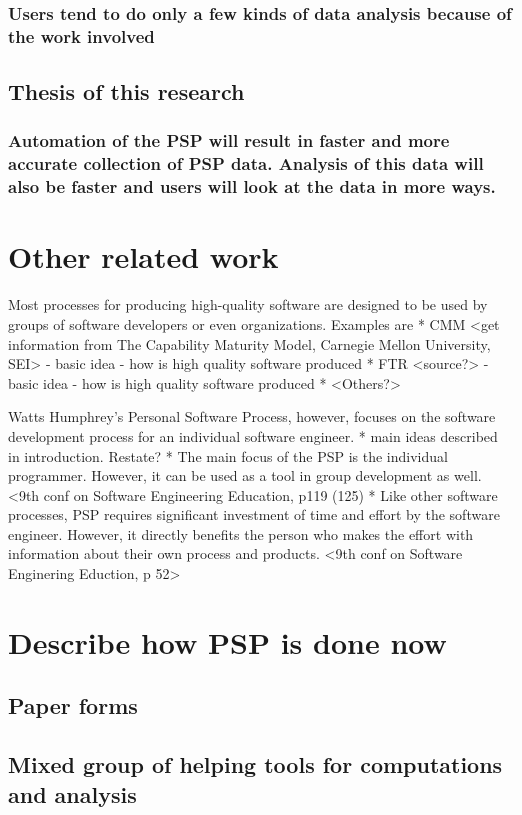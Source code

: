 \subsection{Users tend to do only a few kinds of data analysis because of the work involved}
\section{Thesis of this research}
\subsection{Automation of the PSP will result in faster and more accurate collection of PSP data.  Analysis of this data will also be faster and users will look at the data 
in more ways.}
\chapter{Other related work}

Most processes for producing high-quality software are designed to be used by groups of
software developers or even organizations.  Examples are
* CMM <get information from The Capability Maturity Model, Carnegie Mellon University, SEI>
  - basic idea
  - how is high quality software produced
* FTR <source?>
  - basic idea
  - how is high quality software produced
* <Others?>

Watts Humphrey's Personal Software Process, however, focuses on the software development
process for an individual software engineer.
* main ideas described in introduction.  Restate?
* The main focus of the PSP is the individual programmer.  However, it can be used as 
a tool in group development as well.  <9th conf on Software Engineering Education, p119 (125)
* Like other software processes, PSP requires significant investment of time and effort by the
  software engineer.  However, it directly benefits the person who makes the effort with 
  information about their own process and products. <9th conf on Software Enginering Eduction,   
  p 52>
 
\chapter{Describe how PSP is done now}
\section{Paper forms}
\section{Mixed group of helping tools for computations and analysis}
